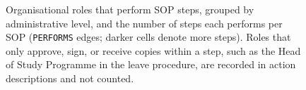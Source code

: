 \begin{figure}[!htbp]
{}
\caption{Organisational roles that perform SOP steps, grouped by administrative level, and the number of steps each performs per SOP (\texttt{PERFORMS} edges; darker cells denote more steps). Roles that only approve, sign, or receive copies within a step, such as the Head of Study Programme in the leave procedure, are recorded in action descriptions and not counted.}
\label{fig:actors}
\end{figure}

